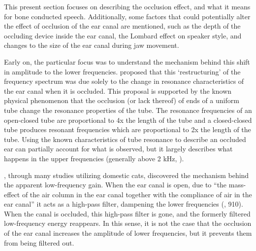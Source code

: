 This present section focuses on describing the occlusion effect, and what it means for bone conducted speech. Additionally, some factors that could potentially alter the effect of occlusion of the ear canal are mentioned, such as the depth of the occluding device inside the ear canal, the Lombard effect on speaker style, and changes to the size of the ear canal during jaw movement.


Early on, the particular focus was to understand the mechanism behind this shift in amplitude to the lower frequencies. \cite{huizing:60} proposed that this `restructuring' of the frequency spectrum was due solely to the change in resonance characteristics of the ear canal when it is occluded.  This proposal is supported by the known physical phenomenon that the occlusion (or lack thereof) of ends of a uniform tube change the resonance properties of the tube. The resonance frequencies of an open-closed tube are proportional to 4x the length of the tube and a closed-closed tube produces resonant frequencies which are proportional to 2x the length of the tube.  Using the known characteristics of tube resonance to describe an occluded ear can partially account for what is observed, but it largely describes what happens in the upper frequencies (generally above 2 kHz, \cite{stenfelt:03}).  

\cite{tonndorf:66}, through many studies utilizing domestic cats,  discovered the mechanism behind the apparent low-frequency gain.  When the ear canal is open, due to ``the mass-effect of the air column in the ear canal together with the compliance of air in the ear canal'' it acts as a high-pass filter, dampening the lower frequencies (\cite{stenfelt:03}, 910).  When the canal is occluded, this high-pass filter is gone, and the formerly filtered low-frequency energy reappears.  In this sense, it is not the case that the occlusion of the ear canal increases the amplitude of lower frequencies, but it prevents them from being filtered out.


